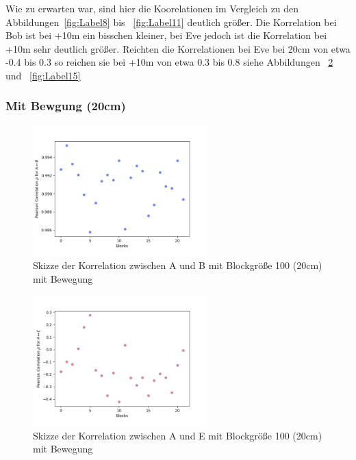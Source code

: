 \documentclass[12pt,a4paper]{article}
\begin{document}
Wie zu erwarten war, sind hier die Koorelationen im 
Vergleich zu den Abbildungen~\ref{fig:Label8} bis
~\ref{fig:Label11} deutlich größer. Die Korrelation bei 
Bob ist bei +10m ein bisschen kleiner, bei Eve jedoch ist die Korrelation bei +10m sehr deutlich größer. Reichten die Korrelationen bei Eve bei 20cm von etwa -0.4 bis 0.3 so 
reichen sie bei +10m von etwa 0.3 bis 0.8 siehe Abbildungen
~\ref{fig:Label13} und ~\ref{fig:Label15} 



\subsubsection*{Mit Bewgung (20cm)}


\begin{figure}[hbt!]
	\centering
		\includegraphics[width=0.6\textwidth ]
		{Bilder/a3-t3a-mb-block100-correlation-AB.png}
		\caption{Skizze der Korrelation zwischen A und B mit Blockgröße 100 (20cm) mit Bewegung}
		\label{fig:Label12}
\end{figure}

\begin{figure}[hbt!]
	\centering
		\includegraphics[width=0.6\textwidth ]
		{Bilder/a3-t3a-mb-block100-correlation-AE.png}
		\caption{Skizze der Korrelation zwischen A und E mit Blockgröße 100 (20cm) mit Bewegung}
		\label{fig:Label13}
\end{figure}
\clearpage
\end{document}
